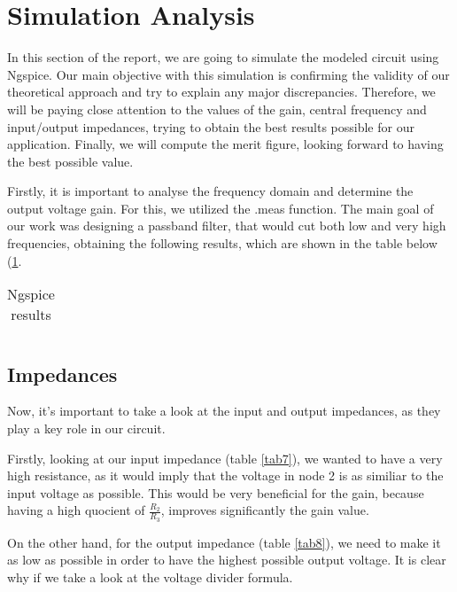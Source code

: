 \section{Simulation Analysis}

In this section of the report, we are going to simulate the modeled circuit using Ngspice. Our main objective with this simulation is confirming the validity of our theoretical approach and try to explain any major discrepancies. Therefore, we will be paying close attention to the values of the gain, central frequency and input/output impedances, trying to obtain the best results possible for our application. Finally, we will compute the merit figure, looking forward to having the best possible value.

Firstly, it is important to analyse the frequency domain and determine the output voltage gain. For this, we utilized the .meas function.
The main goal of our work was designing a passband filter, that would cut both low and very high frequencies, obtaining the following results, which are shown in the table below (\ref{tab6}.

\begin{table}[H]
\centering
\begin{tabularx}{0.6\textwidth} {
  | >{\raggedright\arraybackslash}X
  | >{\raggedleft\arraybackslash}X | }
 \hline

\end{tabularx}
\caption{Ngspice results}
\label{tab6}
\end{table}

\subsection{Impedances}

Now, it's important to take a look at the input and output impedances, as they play a key role in our circuit.

Firstly, looking at our input impedance (table \ref{tab7}), we wanted to have a very high resistance, as it would imply that the voltage in node 2 is as similiar to the input voltage as possible. This would be very beneficial for the gain, because having a high quocient of $\frac{R_2}{R_3}$, improves significantly the gain value.

On the other hand, for the output impedance (table \ref{tab8}), we need to make it as low as possible in order to have the highest possible output voltage. It is clear why if we take a look at the voltage divider formula.

